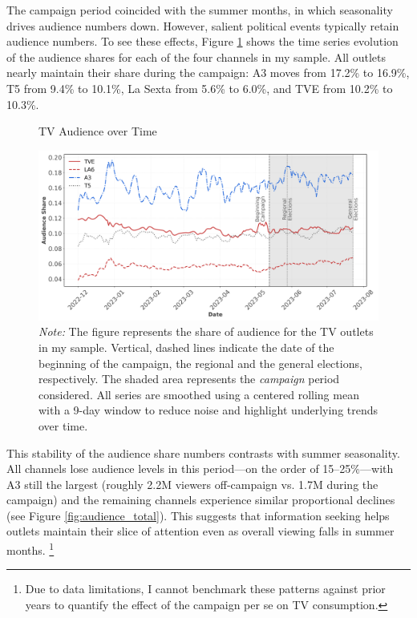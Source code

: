\documentclass[12pt]{article}
\begin{document}
	
The campaign period coincided with the summer months, in which seasonality drives audience numbers down. However, salient political events typically retain audience numbers. To see these effects, 	Figure \ref{fig:audience_share} shows the time series evolution of the audience shares for each of the four channels in my sample. All outlets nearly maintain their share during the campaign: A3 moves from 17.2\% to 16.9\%, T5 from 9.4\% to 10.1\%, La Sexta from 5.6\% to 6.0\%, and TVE from 10.2\% to 10.3\%. 
	
	
		\begin{figure}[!htbp]
		\caption{TV Audience over Time}
		\centering
		\includegraphics[width=150mm]{figures/tv_audience_sharev2}
		\caption*{\small \textit{Note:} The figure represents the share of audience for the TV outlets in my sample.  Vertical, dashed lines indicate the date of the beginning of the campaign, the regional and the general elections, respectively. The shaded area represents the \textit{campaign} period considered.  All series are smoothed using a centered rolling mean with a 9-day window to reduce noise and highlight underlying trends over time.}
		\label{fig:audience_share}
	\end{figure}
	
	

This stability of the audience share numbers contrasts with summer seasonality. All channels lose audience levels in this period—on the order of 15–25\%—with A3 still the largest (roughly 2.2M viewers off-campaign vs. 1.7M during the campaign) and the remaining channels experience similar proportional declines (see Figure  \ref{fig:audience_total}). This  suggests that information seeking  helps outlets maintain their slice of attention even as overall viewing falls in summer months. \footnote{ Due to data limitations, I cannot benchmark these patterns against prior years to quantify the effect of the campaign per se on TV consumption. }
\end{document}
